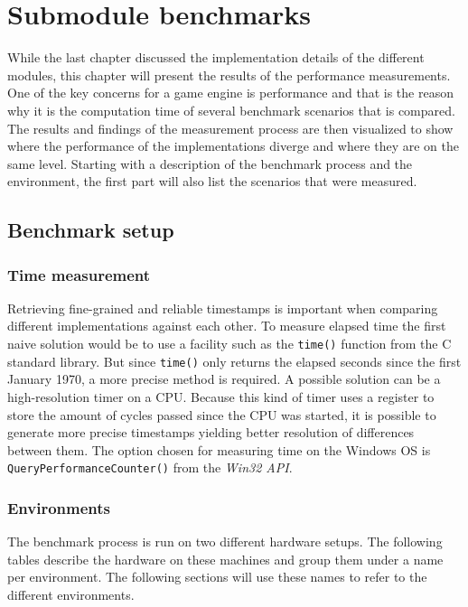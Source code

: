 \chapter{Submodule benchmarks}

While the last chapter discussed the implementation details of the different modules, this chapter will present the results of the performance measurements. One of the key concerns for a game engine is performance and that is the reason why it is the computation time of several benchmark scenarios that is compared. The results and findings of the measurement process are then visualized to show where the performance of the implementations diverge and where they are on the same level. Starting with a description of the benchmark process and the environment, the first part will also list the scenarios that were measured. 

\section{Benchmark setup}

\subsection{Time measurement}

Retrieving fine-grained and reliable timestamps is important when comparing different implementations against each other. To measure elapsed time the first naive solution would be to use a facility such as the \texttt{time()} function from the C standard library. But since \texttt{time()} only returns the elapsed seconds since the first January 1970, a more precise method is required. A possible solution can be a high-resolution timer on a CPU. Because this kind of timer uses a register to store the amount of cycles passed since the CPU was started, it is possible to generate more precise timestamps yielding better resolution of differences between them. The option chosen for measuring time on the Windows \ac{OS} is \texttt{QueryPerformanceCounter()} from the \textit{Win32 \ac{API}}.

\subsection{Environments}

The benchmark process is run on two different hardware setups. The following tables describe the hardware on these machines and group them under a name per environment. The following sections will use these names to refer to the different environments.

